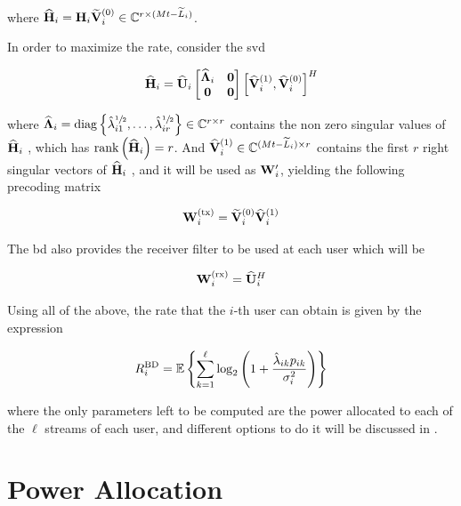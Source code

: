 \noindent
where $\mathbf{\widehat{H}}_i = \mathbf{H}_i\mathbf{\widetilde{V}}_i^{(0)} \in \mathbb{C}^{r \times (Mt - \widetilde{L}_i)}$.

In order to maximize the rate, consider the \gls{svd}

\begin{equation} \label{eq:svd_max_rate}
    \mathbf{\widehat{H}}_i = \mathbf{\widehat{U}}_i \begin{bmatrix}
        \mathbf{\widehat{\Lambda}}_i & \mathbf{0} \\
        \mathbf{0}        & \mathbf{0}
    \end{bmatrix} \left[ \mathbf{\widehat{V}}_i^{(1)}, \mathbf{\widehat{V}}_i^{(0)} \right]^H
\end{equation}

\noindent
where $\mathbf{\widehat{\Lambda}}_i = \operatorname*{diag}\left\{\hat{\lambda}^{\sfrac{1}{2}}_{i1}, \ldots,
\hat{\lambda}^{\sfrac{1}{2}}_{ir} \right\} \in \mathbb{C}^{r \times r}$ contains the non zero singular
values of $\mathbf{\widehat{H}}_i$ , which has $\operatorname*{rank}\left(\mathbf{\widehat{H}}_i\right) = r$. And
$\mathbf{\widehat{V}}_i^{(1)} \in \mathbb{C}^{(Mt - \widetilde{L}_i) \times r}$ contains the first $r$ right
singular vectors of $\mathbf{\widehat{H}}_i$ , and it will be used as $\mathbf{W}_i^{\prime}$,
yielding the following precoding matrix

\begin{equation} \label{eq:bd_precod}
    \mathbf{W}^{(\text{tx})}_i = \mathbf{\widetilde{V}}_i^{(0)} \mathbf{\widehat{V}}_i^{(1)}
\end{equation}

The \gls{bd} also provides the receiver filter to be used at each user which
will be

\begin{equation} \label{eq:bd_eq}
    \mathbf{W}^{(\text{rx})}_i = \mathbf{\widehat{U}}_i^H
\end{equation}

Using all of the above, the rate that the $i$-th user can obtain is given by the
expression

\begin{equation} \label{eq:bd_ergodic_capacity}
    R_i^{\text{BD}} = \mathbb{E}\left\{
        \sum\limits_{k = 1}^{\ell} \log_2 \left(1 + \frac{\hat{\lambda}_{ik}
        p_{ik}}{\sigma_i^2} \right)
    \right\}
\end{equation}

\noindent
where the only parameters left to be computed are the power allocated to each of
the $\ell$ streams of each user, and different options to do it will be
discussed in .

\section{Power Allocation}\label{sec:power_allocation}


